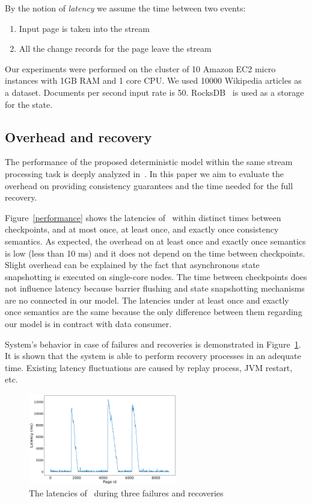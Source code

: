 By the notion of {\it latency} we assume the time between two events: 

\begin{enumerate}
    \item Input page is taken into the stream
    \item All the change records for the page leave the stream
\end{enumerate}

Our experiments were performed on the cluster of 10 Amazon EC2 micro instances with 1GB RAM and 1 core CPU. We used 10000 Wikipedia articles as a dataset. Documents per second input rate is 50. RocksDB~\cite{rocksdb} is used as a storage for the state.

\subsection{Overhead and recovery}
The performance of the proposed deterministic model within the same stream processing task is deeply analyzed in~\cite{we2018seim}. In this paper we aim to evaluate the overhead on providing consistency guarantees and the time needed for the full recovery.

Figure~\ref{performance} shows the latencies of \FlameStream\ within distinct times between checkpoints, and at most once, at least once, and exactly once consistency semantics. As expected, the overhead on at least once and exactly once semantics is low (less than 10 ms) and it does not depend on the time between checkpoints. Slight overhead can be explained by the fact that asynchronous state snapshotting is executed on single-core nodes. The time between checkpoints does not influence latency because barrier flushing and state snapshotting mechanisms are no connected in our model. The latencies under at least once and exactly once semantics are the same because the only difference between them regarding our model is in contract with data consumer.

System's behavior in case of failures and recoveries is demonstrated in Figure~\ref{recovery}. It is shown that the system is able to perform recovery processes in an adequate time. Existing latency fluctuations are caused by replay process, JVM restart, etc.

\begin{figure}[htbp]
  \centering
  \includegraphics[width=0.58\textwidth]{pics/blink}
  \caption{The latencies of \FlameStream\ during three failures and recoveries}
  \label {recovery}
\end{figure}

